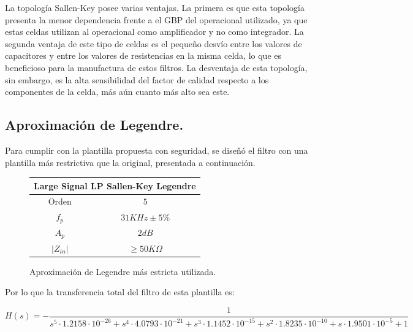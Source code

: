 La topología Sallen-Key posee varias ventajas. La primera es que esta topología presenta la menor dependencia frente a el GBP del operacional utilizado, ya que estas celdas utilizan al operacional como amplificador y no como integrador. La segunda ventaja de este tipo de celdas es el pequeño desvío entre los valores de capacitores y entre los valores de resistencias en la misma celda, lo que es beneficioso para la manufactura de estos filtros. La desventaja de esta topología, sin embargo, es la alta sensibilidad del factor de calidad respecto a los componentes de la celda, más aún cuanto más alto sea este. 

\subsection{Aproximación de Legendre.}

Para cumplir con la plantilla propuesta con seguridad, se diseñó el filtro con una plantilla más restrictiva que la original, presentada a continuación.

\begin{figure}[H]
		\begin{table}[H]
			\centering
			\begin{tabular}{@{}cc@{}}
			\toprule
			\multicolumn{2}{c}{Large Signal LP Sallen-Key Legendre} \\ \midrule
			Orden & $5$ \\
			$f_p$ & $31KHz \pm 5\%$ \\
			$A_p$ & $2dB$ \\
			$\left| Z_{in}\right|$ & $\geq 50K\Omega$ \\ \bottomrule
			\end{tabular}
		\end{table}
		\caption{Aproximación de Legendre más estricta utilizada.}
		\label{aprox_leg_est}
\end{figure}

Por lo que la transferencia total del filtro de esta plantilla es:

\begin{equation}
H(s) = -\frac{1}{s^5\cdot 1.2158\cdot10^{-26}+s^4\cdot 4.0793\cdot10^{-21}+s^3\cdot 1.1452\cdot10^{-15}+s^2\cdot 1.8235\cdot10^{-10}+s \cdot 1.9501\cdot10^{-5}+1}	
\label{hslegteo}
\end{equation}

